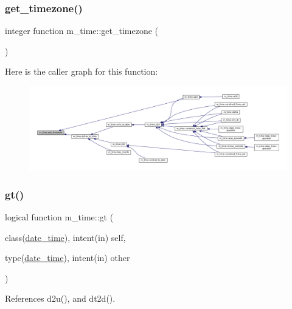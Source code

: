 \subsubsection{\texorpdfstring{get\+\_\+timezone()}{get\_timezone()}}
{\footnotesize\ttfamily integer function m\+\_\+time\+::get\+\_\+timezone (\begin{DoxyParamCaption}{ }\end{DoxyParamCaption})\hspace{0.3cm}{\ttfamily [private]}}

Here is the caller graph for this function\+:\nopagebreak
\begin{figure}[H]
\begin{center}
\leavevmode
\includegraphics[width=350pt]{namespacem__time_a7903410a1d28bcdf3d33ab0c2d74b124_icgraph}
\end{center}
\end{figure}
\mbox{\label{namespacem__time_a62a48ba3b42ccf837b48584293231021}} 
\subsubsection{\texorpdfstring{gt()}{gt()}}
{\footnotesize\ttfamily logical function m\+\_\+time\+::gt (\begin{DoxyParamCaption}\item[{class(\mbox{\hyperlink{structm__time_1_1date__time}{date\+\_\+time}}), intent(in)}]{self,  }\item[{type(\mbox{\hyperlink{structm__time_1_1date__time}{date\+\_\+time}}), intent(in)}]{other }\end{DoxyParamCaption})\hspace{0.3cm}{\ttfamily [private]}}



References d2u(), and dt2d().

